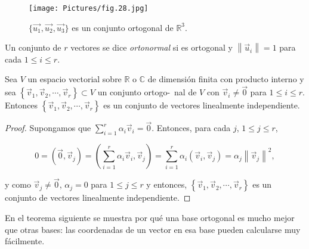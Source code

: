 \begin{figure}
    \centering
    \texttt{[image: Pictures/fig.28.jpg]}
    \caption{$\{\vec{u_1}, \vec{u_2}, \vec{u_3}\}$ es un conjunto ortogonal de $\mathbb{R}^3$.}
    \label{Conj.Ortog}
\end{figure}

\bigskip

\begin{remark}
Un conjunto de $r$ vectores se dice \textit{ortonormal} si es ortogonal y $\left\|\vec{u}_i\right\|=1$  para cada $1\leq i\leq r$.
\end{remark}

\bigskip

\begin{theorem}

Sea $V$ un espacio vectorial sobre $\mathbb{R}$ o $\mathbb{C}$ de dimensión finita con producto interno y sea $\left\{\vec{v}_1,\vec{v}_2,\cdots, \vec{v}_r\right\}\subset V$  un conjunto ortogo-\ nal de $V$ con $\vec{v}_i\neq \vec{0}$  para  $1\leq i\leq r$. Entonces  $\left\{\vec{v}_1,\vec{v}_2,\cdots, \vec{v}_r\right\}$ es un conjunto de vectores  linealmente independiente.

\begin{proof}

Supongamos que $\sum_{i=1}^r  \alpha_i \vec{v}_i = \vec{0}$. Entonces, para cada $j$, $ 1 \leq j \leq r$,


$$ 0=(\vec{0}, \vec{v}_j)= ( \sum_{i=1}^r  \alpha_i \vec{v}_i,\vec{v}_j) = \sum_{i=1}^r  \alpha_i (\vec{v}_i,\vec{v}_j )= \alpha_j \left\|\vec{v}_j\right\|^{2}, $$

\noindent
y como $\vec{v}_j \neq \vec{0}$,  $ \alpha_j=0$ para  $ 1 \leq j \leq r$ y entonces, $\left\{\vec{v}_1,\vec{v}_2,\cdots, \vec{v}_r\right\}$ es un conjunto de vectores linealmente independiente.

 
\end{proof}

\end{theorem}

\bigskip

En el teorema siguiente se muestra por qué una base ortogonal es mucho mejor que otras bases: las coordenadas de un vector en esa base  pueden calcularse muy  fácilmente.

\bigskip


